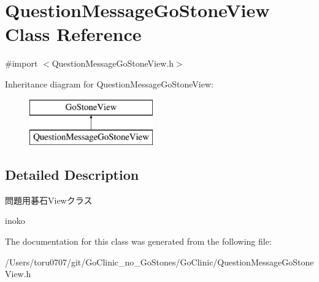 \hypertarget{interface_question_message_go_stone_view}{
\section{QuestionMessageGoStoneView Class Reference}
\label{interface_question_message_go_stone_view}
}


{\ttfamily \#import $<$QuestionMessageGoStoneView.h$>$}

Inheritance diagram for QuestionMessageGoStoneView:\begin{figure}[H]
\begin{center}
\leavevmode
\includegraphics[height=2.000000cm]{interface_question_message_go_stone_view}
\end{center}
\end{figure}


\subsection{Detailed Description}
問題用碁石Viewクラス

inoko 

The documentation for this class was generated from the following file:\begin{DoxyCompactItemize}
\item 
/Users/toru0707/git/GoClinic\_\-no\_\-GoStones/GoClinic/QuestionMessageGoStoneView.h\end{DoxyCompactItemize}
